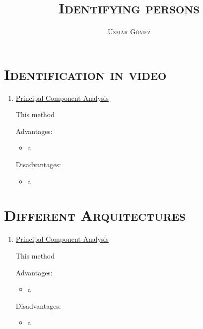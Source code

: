 \documentclass[10pt,letterpaper]{article}
\title{{\scshape\huge Identifying persons}}
\author{{\scshape\Large Uzmar Gómez}}
\newcommand{\ssection}[1]{%
  \section*{\normalfont\scshape #1}}
\begin{document}
\maketitle

\ssection{Identification in video}

\begin{enumerate}
    \item[] \underline{Principal Component Analysis}

    This method

    Advantages:
    \begin{itemize}
        \item a
    \end{itemize}

    Disadvantages:
    \begin{itemize}
        \item a
    \end{itemize}
\end{enumerate}

\ssection{Different Arquitectures}

\begin{enumerate}
    \item[] \underline{Principal Component Analysis}

    This method

    Advantages:
    \begin{itemize}
        \item a
    \end{itemize}

    Disadvantages:
    \begin{itemize}
        \item a
    \end{itemize}
\end{enumerate}
\end{document}
